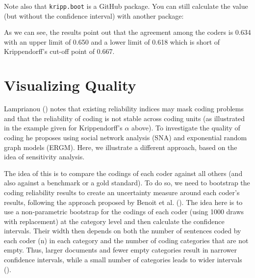 \documentclass[
]{book}
\newenvironment{Shaded}{\begin{snugshade}}{\end{snugshade}}
\newcommand{\AttributeTok}[1]{\textcolor[rgb]{0.13,0.29,0.53}{#1}}
\newcommand{\FunctionTok}[1]{\textcolor[rgb]{0.13,0.29,0.53}{\textbf{#1}}}
\newcommand{\NormalTok}[1]{#1}
\newcommand{\OtherTok}[1]{\textcolor[rgb]{0.56,0.35,0.01}{#1}}
\newcommand{\SpecialCharTok}[1]{\textcolor[rgb]{0.81,0.36,0.00}{\textbf{#1}}}
\newcommand{\StringTok}[1]{\textcolor[rgb]{0.31,0.60,0.02}{#1}}
\begin{document}
Note also that \texttt{kripp.boot} is a GitHub package. You can still calculate the value (but without the confidence interval) with another package:

\begin{Shaded}
\end{Shaded}

As we can see, the results point out that the agreement among the coders is 0.634 with an upper limit of 0.650 and a lower limit of 0.618 which is short of Krippendorff's cut-off point of 0.667.

\section{Visualizing Quality}\label{visualizing-quality}

Lamprianou () notes that existing reliability indices may mask coding problems and that the reliability of coding is not stable across coding units (as illustrated in the example given for Krippendorff's \(\alpha\) above). To investigate the quality of coding he proposes using social network analysis (SNA) and exponential random graph models (ERGM). Here, we illustrate a different approach, based on the idea of sensitivity analysis.

The idea of this is to compare the codings of each coder against all others (and also against a benchmark or a gold standard). To do so, we need to bootstrap the coding reliability results to create an uncertainty measure around each coder's results, following the approach proposed by Benoit et al. (). The idea here is to use a non-parametric bootstrap for the codings of each coder (using 1000 draws with replacement) at the category level and then calculate the confidence intervals. Their width then depends on both the number of sentences coded by each coder (n) in each category and the number of coding categories that are not empty. Thus, larger documents and fewer empty categories result in narrower confidence intervals, while a small number of categories leads to wider intervals ().
\end{document}
